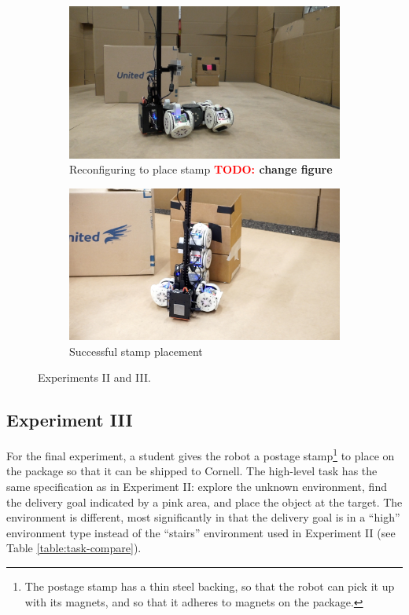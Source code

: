 \documentclass[journal]{IEEEtran}
\newcommand{\TODO}[1]{ {\bf \textcolor{red}{TODO:} #1 }}
\begin{document}
\begin{figure}[t]
    \begin{subfigure}[t]{0.24\textwidth}
        \includegraphics[width=\textwidth]{images/stamp_explore_ground.jpg}
        \caption{Reconfiguring to place stamp \TODO{change figure} }
    \end{subfigure}
    \begin{subfigure}[t]{0.24\textwidth}
        \includegraphics[width=\textwidth]{images/stamp_placing.jpg}
        \caption{Successful stamp placement}
    \end{subfigure}
      \caption{Experiments II and III.}
      \label{fig:exps}
   \end{figure}

\subsection{Experiment III}

For the final experiment, a student gives the robot a postage stamp\footnote{The postage stamp has a thin steel backing, so that the robot can pick it up with its magnets, and so that it adheres to magnets on the package.} to place on the package so that it can be shipped to Cornell. The high-level task has the same specification as in Experiment II: explore the unknown environment, find the delivery goal indicated by a pink area, and place the object at the target. The environment is different, most significantly in that the delivery goal is in a ``high'' environment type instead of the ``stairs'' environment used in Experiment II (see Table \ref{table:task-compare}).
\end{document}
